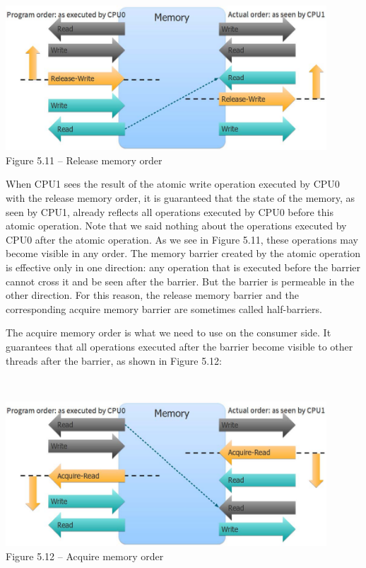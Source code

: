\hspace*{\fill} \\ %
\begin{center}
\includegraphics[width=0.9\textwidth]{content/1/chapter5/images/11.jpg}\\
Figure 5.11 – Release memory order
\end{center}

When CPU1 sees the result of the atomic write operation executed by CPU0 with the release memory order, it is guaranteed that the state of the memory, as seen by CPU1, already reflects all operations executed by CPU0 before this atomic operation. Note that we said nothing about the operations executed by CPU0 after the atomic operation. As we see in Figure 5.11, these operations may become visible in any order. The memory barrier created by the atomic operation is effective only in one direction: any operation that is executed before the barrier cannot cross it and be seen after the barrier. But the barrier is permeable in the other direction. For this reason, the release memory barrier and the corresponding acquire memory barrier are sometimes called half-barriers.

The acquire memory order is what we need to use on the consumer side. It guarantees that all operations executed after the barrier become visible to other threads after the barrier, as shown in Figure 5.12:

\hspace*{\fill} \\ %
\begin{center}
\includegraphics[width=0.9\textwidth]{content/1/chapter5/images/12.jpg}\\
Figure 5.12 – Acquire memory order
\end{center}

